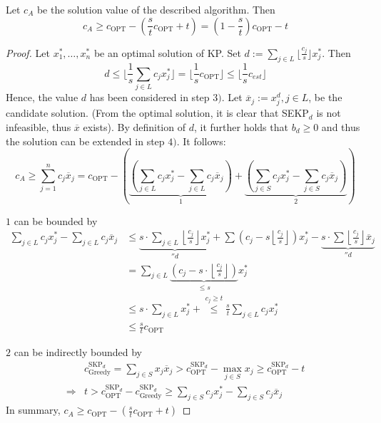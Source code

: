 \begin{thm}\label{thm:thm26.4}
Let $c_A$ be the solution value of the described algorithm. Then 
\[
c_A \geq c_{\text{OPT}} - \left ( \frac{s}{t} c_{\text{OPT}} + t \right ) = (1 - \frac{s}{t}) c_{\text{OPT}} - t
\]
\end{thm}
\begin{proof}
Let $x_1^*, \dots, x_n^*$ be an optimal solution of KP.
Set $d := \sum_{j \in L} \lfloor \frac{c_j}{s} \rfloor x_j^*$.
Then 
\[
	d \leq \lfloor \frac{1}{s} \sum_{j \in L} c_j x_j^* \rfloor = \lfloor \frac{1}{s} c_{\text{OPT}} \rfloor \leq \lfloor \frac{1}{s} c_{est} \rfloor
\]
Hence, the value $d$ has been considered in step $3)$.
Let $\overline{x}_j := x_j^d, j \in L$, be the candidate solution.
(From the optimal solution, it is clear that SEKP$_d$ is not infeasible, thus $\overline{x}$ exists).
By definition of $d$, it further holds that $b_d \geq 0$ and thus the solution can be extended in step $4)$.
It follows:
\[
	c_A \geq \sum_{j=1}^n c_j \overline{x}_j = c_{\text{OPT}} - \left (
	\underbrace{\left ( \sum_{j \in L} c_j x_j^* - \sum_{j \in L} c_j \overline{x}_j \right )}_1 +
	\underbrace{\left ( \sum_{j \in S} c_j x_j^* - \sum_{j \in S} c_j \overline{x}_j \right )}_2
	\right )
\]

$1$ can be bounded by 
\begin{align*}
	\sum_{j \in L} c_j x_j^* - \sum_{j \in L} c_j \overline{x}_j &\leq 
	\underbrace{s \cdot \sum_{j \in L} \left \lfloor \frac{c_j}{s} \right \rfloor x_j^*}_{''d} + \sum \left ( c_j - s \left \lfloor \frac{c_j}{s} \right \rfloor \right )x_j^* - \underbrace{s \cdot \sum \left \lfloor \frac{c_j}{s} \right \rfloor \overline{x}_j}_{''d} \\
	&= \sum_{j \in L} \underbrace{\left (c_j - s \cdot \left \lfloor \frac{c_j}{s} \right \rfloor \right )}_{\leq s} x_j^* \\
	&\leq s \cdot \sum_{j \in L} x_j^* +\stackrel{c_j \geq t}{\leq} \frac{s}{t} \sum_{j \in L} c_j x_j^* \\
	&\leq \frac{s}{t} c_{\text{OPT}}
\end{align*}

$2$ can be indirectly bounded by
\begin{align*}
& c_{\text{Greedy}}^{\text{SKP}_d} = \sum_{j \in S} x_j \overline{x}_j > c_{\text{OPT}}^{\text{SKP}_d} - \max_{j \in S} x_j \geq c_{\text{OPT}}^{\text{SKP}_d} - t \\
\Rightarrow & t > c_{\text{OPT}}^{\text{SKP}_d} - c_{\text{Greedy}}^{\text{SKP}_d} \geq \sum_{j \in S} c_j x_j^* - \sum_{j \in S} c_j \overline{x}_j
\end{align*}
In summary, $c_A \geq c_{\text{OPT}} - \left (\frac{s}{t} c_{\text{OPT}} + t \right )$
\end{proof}
